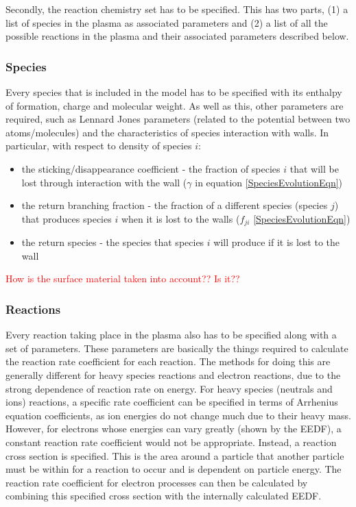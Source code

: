 \documentclass[11pt, oneside]{article}   	%
\begin{document}
Secondly, the reaction chemistry set has to be specified. 
This has two parts, (1) a list of species in the plasma as associated parameters and (2) a list of all the possible reactions in the plasma and their associated parameters described below.


\subsubsection*{Species}
Every species that is included in the model has to be specified with its enthalpy of formation, charge and molecular weight.
As well as this, other parameters are required, such as Lennard Jones parameters (related to the potential between two atoms/molecules) and the characteristics of species interaction with walls.
In particular, with respect to density of species $i$:
\begin{itemize}
\item the sticking/disappearance coefficient - the fraction of species $i$ that will be lost through interaction with the wall ($\gamma$ in equation \ref{SpeciesEvolutionEqn})
\item the return branching fraction - the fraction of a different species (species $j$) that produces species $i$ when it is lost to the walls ($f_{ji}$ \ref{SpeciesEvolutionEqn})
\item the return species - the species that species $i$ will produce if it is lost to the wall
\end{itemize}

\textcolor{red}{How is the surface material taken into account?? Is it??}


\subsubsection{Reactions}
\label{Reactions}
Every reaction taking place in the plasma also has to be specified along with a set of parameters.
These parameters are basically the things required to calculate the reaction rate coefficient for each reaction.
The methods for doing this are generally different for heavy species reactions and electron reactions, due to the strong dependence of reaction rate on energy.
For heavy species (neutrals and ions) reactions, a specific rate coefficient can be specified in terms of Arrhenius equation coefficients, as ion energies do not change much due to their heavy mass.
However, for electrons whose energies can vary greatly (shown by the EEDF), a constant reaction rate coefficient would not be appropriate.
Instead, a reaction cross section is specified.
This is the area around a particle that another particle must be within for a reaction to occur and is dependent on particle energy.
The reaction rate coefficient for electron processes can then be calculated by combining this specified cross section with the internally calculated EEDF.
\end{document}

